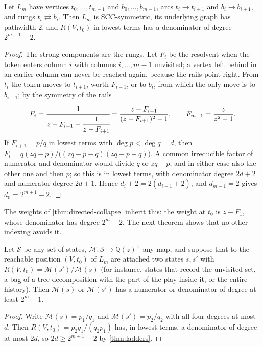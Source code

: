 \documentclass[final]{siamart0516}
\numberwithin{theorem}{section}
\numberwithin{equation}{section}
\theoremstyle{siamnonum}
\theoremstyle{plain}
\newcommand{\QQ}{\mathbb{Q}}
\newcommand{\Qz}{\QQ(z)}
\newcommand{\Mpot}{\mathcal{M}}           %
\begin{document}
\begin{theorem}\label{thm:ladders}
Let $L_m$ have vertices $t_0,\dots,t_{m-1}$ and $b_0,\dots,b_{m-1}$, arcs $t_i\to t_{i+1}$ and $b_i\to b_{i+1}$, and rungs $t_i\rightleftarrows b_i$. Then $L_m$ is SCC-symmetric, its underlying graph has pathwidth $2$, and $R(V,t_0)$ in lowest terms has a denominator of degree $2^{m+1}-2$.
\end{theorem}
\begin{proof}
The strong components are the rungs. Let $F_i$ be the resolvent when the token enters column $i$ with columns $i,\dots,m-1$ unvisited; a vertex left behind in an earlier column can never be reached again, because the rails point right. From $t_i$ the token moves to $t_{i+1}$, worth $F_{i+1}$, or to $b_i$, from which the only move is to $b_{i+1}$; by the symmetry of the rails
\[
F_i=\cfrac{1}{z-F_{i+1}-\cfrac{1}{z-F_{i+1}}}=\frac{z-F_{i+1}}{(z-F_{i+1})^{2}-1},\qquad F_{m-1}=\frac{z}{z^{2}-1}.
\]
If $F_{i+1}=p/q$ in lowest terms with $\deg p<\deg q=d$, then $F_i=q(zq-p)/\bigl((zq-p-q)(zq-p+q)\bigr)$. A common irreducible factor of numerator and denominator would divide $q$ or $zq-p$, and in either case also the other one and then $p$; so this is in lowest terms, with denominator degree $2d+2$ and numerator degree $2d+1$. Hence $d_i+2=2(d_{i+1}+2)$, and $d_{m-1}=2$ gives $d_0=2^{m+1}-2$.
\end{proof}

The weights of \cref{thm:directed-collapse} inherit this: the weight at $t_0$ is $z-F_1$, whose denominator has degree $2^{m}-2$. The next theorem shows that no other indexing avoids it.

\begin{theorem}\label{thm:intrinsic-degree}
Let $\mathcal S$ be any set of states, $\Mpot\colon\mathcal S\to\Qz^{\times}$ any map, and suppose that to the reachable position $(V,t_0)$ of $L_m$ are attached two states $s,s'$ with $R(V,t_0)=\Mpot(s')/\Mpot(s)$ \textup{(}for instance, states that record the unvisited set, a bag of a tree decomposition with the part of the play inside it, or the entire history\textup{)}. Then $\Mpot(s)$ or $\Mpot(s')$ has a numerator or denominator of degree at least $2^{m}-1$.
\end{theorem}
\begin{proof}
Write $\Mpot(s)=p_1/q_1$ and $\Mpot(s')=p_2/q_2$ with all four degrees at most $d$. Then $R(V,t_0)=p_2q_1/(q_2p_1)$ has, in lowest terms, a denominator of degree at most $2d$, so $2d\ge2^{m+1}-2$ by \cref{thm:ladders}.
\end{proof}
\end{document}
